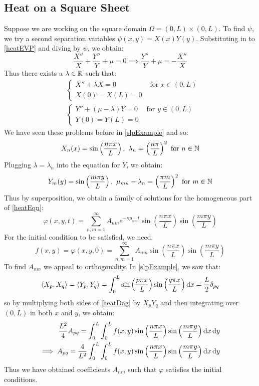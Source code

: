 \documentclass[../main.tex]{subfiles}
\begin{document}
\subsection{Heat on a Square Sheet}
Suppose we are working on the square domain $\Omega = (0, L) \times (0, L)$.
To find $\psi$, we try a second separation variables $\psi(x, y) = X(x)Y(y)$.
Substituting in to \cref{heatEVP} and diving by $\psi$, we obtain:
\[
  \frac{X''}{X} + \frac{Y''}{Y} + \mu = 0 \implies \frac{Y''}{Y} + \mu = - \frac{X''}{X}
\]
Thus there exists a $\lambda \in \mathbb{R}$ such that:
\begin{align*}
  &\begin{cases}
  X'' + \lambda X = 0 & \text{ for } x \in (0, L) \\
  X(0) = X(L) = 0 &
  \end{cases} \\
  &\begin{cases}
  Y'' + (\mu - \lambda)Y = 0 & \text{ for } y \in (0, L) \\
  Y(0) = Y(L) = 0 &
  \end{cases}
\end{align*}
We have seen these problems before in \cref{slpExample} and so:
\[
  X_n(x) = \sin\left(\frac{n \pi x}{L}\right),\ \lambda_n = \left(\frac{n \pi }{L}\right)^2 \text{ for } n \in \N
\]
Plugging $\lambda = \lambda_n$ into the equation for $Y$, we obtain:
\[
  Y_m(y) = \sin\left(\frac{m \pi y}{L}\right),\ \mu_{m n} - \lambda_n = \left(\frac{\pi m}{L}\right)^2 \text{ for } m \in \mathbb{N}
\]
Thus by superposition, we obtain a family of solutions for the homogeneous part of \cref{heatEqn}:
\[
  \varphi(x, y, t) = \sum_{n, m = 1}^{\infty} A_{n m} e^{-\kappa \mu_{n m} t} \sin\left(\frac{n \pi x}{L}\right) \sin\left(\frac{m \pi y}{L}\right)
\]
For the initial condition to be satisfied, we need:
\begin{equation}
  f(x, y) = \varphi(x, y, 0) = \sum_{n, m = 1}^{\infty} A_{n m} \sin\left(\frac{n \pi x}{L}\right) \sin\left(\frac{m \pi y}{L}\right) \label{heatDag} \tag{\dag}
\end{equation}
To find $A_{n m}$ we appeal to orthogonality.
In \cref{slpExample}, we saw that:
\[
  \langle X_p, X_q \rangle = \langle Y_p, Y_q \rangle = \int_{0}^{L} \sin\left(\frac{p \pi x}{L}\right)\sin\left(\frac{q \pi x}{L}\right) \d{x} = \frac{L}{2} \delta_{p q}
\]
so by multiplying both sides of \cref{heatDag} by $X_pY_q$ and then integrating over $(0, L)$ in both $x$ and $y$, we obtain:
\begin{align*}
  \frac{L^2}{4} A_{p q} = \int_{0}^{L} \int_{0}^{L} f(x, y) \sin\left(\frac{n \pi x}{L}\right) \sin\left(\frac{m \pi y}{L}\right)\d{x} \d{y} \\
  \implies A_{p q} = \frac{4}{L^2} \int_{0}^{L} \int_{0}^{L} f(x, y) \sin\left(\frac{n \pi x}{L}\right) \sin\left(\frac{m \pi y}{L}\right)\d{x} \d{y}
\end{align*}
Thus we have obtained coefficients $A_{nm}$ such that $\varphi$ satisfies the initial conditions.
\end{document}
